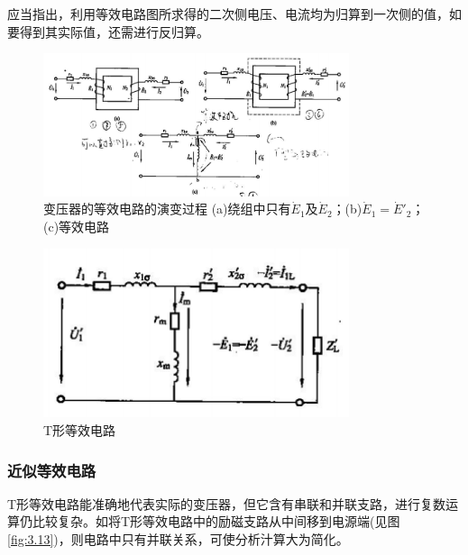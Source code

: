 \documentclass{book}
\begin{document}
应当指出，利用等效电路图所求得的二次侧电压、电流均为归算到一次侧的值，如要得到其实际值，还需进行反归算。
\begin{figure}[H]
	\centering
	\includegraphics[width=0.80\textwidth]{3-11.png}
	\caption{变压器的等效电路的演变过程
		(a)绕组中只有${{\dot{E}}_{1}}$及${{\dot{E}}_{2}}$；(b)${{\dot{E}}_{1}}={{{\dot{E}}'}_{2}}$；(c)等效电路}
	\label{fig_3-11}
\end{figure}
\begin{figure}[H]
	\centering
	\includegraphics[width=0.80\textwidth]{3-12.png}
	\caption{T形等效电路}
	\label{fig_3.12}
\end{figure}

\subsubsection{近似等效电路}
T形等效电路能准确地代表实际的变压器，但它含有串联和并联支路，进行复数运算仍比较复杂。如将T形等效电路中的励磁支路从中间移到电源端(见图\ref{fig:3.13})，则电路中只有并联关系，可使分析汁算大为简化。
\end{document}
